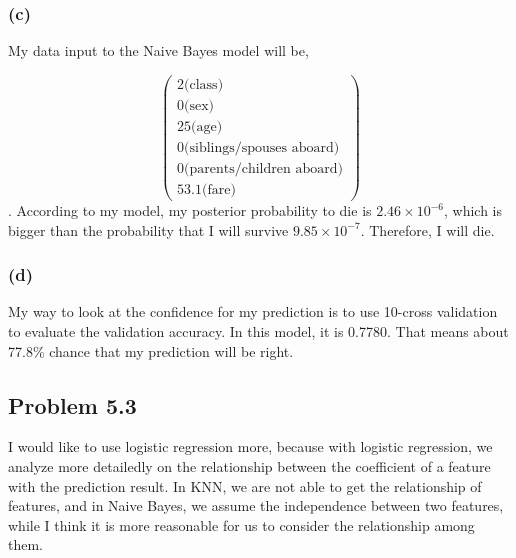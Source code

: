 \documentclass{article}
\begin{document}
\subsubsection*{(c)}
	My data input to the Naive Bayes model will be,

	\begin{equation*}	
	\begin{pmatrix} 2 \text{(class)}\\ 0 \text{(sex)}\\ 25\text{(age)}\\ 0\text{(siblings/spouses aboard)}\\0\text{(parents/children aboard)}\\ 53.1\text{(fare)}\end{pmatrix} 
	\end{equation*}.
	According to my model, my posterior probability to die is $2.46\times10^{-6}$, which is bigger than the probability that I will survive $9.85\times 10^{-7}$. Therefore, I will die.
	
\subsubsection*{(d)}
	My way to look at the confidence for my prediction is to use 10-cross validation to evaluate the validation accuracy. In this model, it is 0.7780. That means about 77.8\% chance that my prediction will be right.

\subsection*{Problem 5.3}
	I would like to use logistic regression more, because with logistic regression, we analyze more detailedly on the relationship between the coefficient of a feature with the prediction result. In KNN, we are not able to get the relationship of features, and in Naive Bayes, we assume the independence between two features, while I think it is more reasonable for us to consider the relationship among them.
	
	

\end{document}
